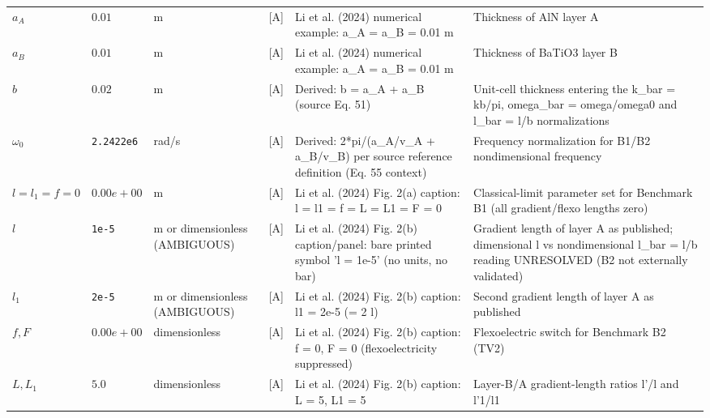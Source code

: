 \begin{xltabular}{\textwidth}{@{}l >{\raggedright\arraybackslash}p{2.2cm} >{\raggedright\arraybackslash}p{2.4cm} c L{2.6cm} Y@{}}
$a_A$ & $0.01$ & m & [A] & Li et al. (2024) numerical example: a\_\hspace{0pt}A = a\_\hspace{0pt}B = 0.01 m & Thickness of AlN layer A \\
$a_B$ & $0.01$ & m & [A] & Li et al. (2024) numerical example: a\_\hspace{0pt}A = a\_\hspace{0pt}B = 0.01 m & Thickness of BaTiO3 layer B \\
$b$ & $0.02$ & m & [A] & Derived: b = a\_\hspace{0pt}A + a\_\hspace{0pt}B (source Eq. 51) & Unit-cell thickness entering the k\_\hspace{0pt}bar = kb/pi, omega\_\hspace{0pt}bar = omega/omega0 and l\_\hspace{0pt}bar = l/b normalizations \\
$\omega_0$ & \texttt{2.2422e6} & rad/s & [A] & Derived: 2*pi/(a\_\hspace{0pt}A/v\_\hspace{0pt}A + a\_\hspace{0pt}B/v\_\hspace{0pt}B) per source reference definition (Eq. 55 context) & Frequency normalization for B1/B2 nondimensional frequency \\
$l{=}l_1{=}f{=}0$ & $0.00e+00$ & m & [A] & Li et al. (2024) Fig. 2(a) caption: l = l1 = f = L = L1 = F = 0 & Classical-limit parameter set for Benchmark B1 (all gradient/flexo lengths zero) \\
$l$ & \texttt{1e-5} & m or dimensionless (AMBIGUOUS) & [A] & Li et al. (2024) Fig. 2(b) caption/panel: bare printed symbol 'l = 1e-5' (no units, no bar) & Gradient length of layer A as published; dimensional l vs nondimensional l\_\hspace{0pt}bar = l/b reading UNRESOLVED (B2 not externally validated) \\
$l_1$ & \texttt{2e-5} & m or dimensionless (AMBIGUOUS) & [A] & Li et al. (2024) Fig. 2(b) caption: l1 = 2e-5 (= 2 l) & Second gradient length of layer A as published \\
$f, F$ & $0.00e+00$ & dimensionless & [A] & Li et al. (2024) Fig. 2(b) caption: f = 0, F = 0 (flexoelectricity suppressed) & Flexoelectric switch for Benchmark B2 (TV2) \\
$L, L_1$ & $5.0$ & dimensionless & [A] & Li et al. (2024) Fig. 2(b) caption: L = 5, L1 = 5 & Layer-B/A gradient-length ratios l'/l and l'1/l1 \\

\end{xltabular}
